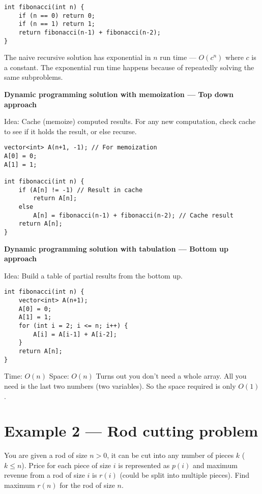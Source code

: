 \documentclass{article}
\begin{document}
\begin{lstlisting}[style=cppstyle]
int fibonacci(int n) {
    if (n == 0) return 0;
    if (n == 1) return 1;
    return fibonacci(n-1) + fibonacci(n-2);
}
\end{lstlisting}

The naive recursive solution has exponential in \(n\) run time — \(O(c^n)\) where \(c\) is a constant. The exponential run time happens because of repeatedly solving the same subproblems.

\textbf{Dynamic programming solution with memoization — Top down approach}

Idea: Cache (memoize) computed results. For any new computation, check cache to see if it holds the result, or else recurse.

\begin{lstlisting}[style=cppstyle]
vector<int> A(n+1, -1); // For memoization
A[0] = 0;
A[1] = 1;

int fibonacci(int n) {
    if (A[n] != -1) // Result in cache
        return A[n];
    else
        A[n] = fibonacci(n-1) + fibonacci(n-2); // Cache result
    return A[n];
}
\end{lstlisting}

\textbf{Dynamic programming solution with tabulation — Bottom up approach}

Idea: Build a table of partial results from the bottom up.

\begin{lstlisting}[style=cppstyle]
int fibonacci(int n) {
    vector<int> A(n+1);
    A[0] = 0;
    A[1] = 1;
    for (int i = 2; i <= n; i++) {
        A[i] = A[i-1] + A[i-2];
    }
    return A[n];
}
\end{lstlisting}

Time: \(O(n)\)  
Space: \(O(n)\)  
Turns out you don't need a whole array. All you need is the last two numbers (two variables). So the space required is only \(O(1)\).

\section{Example 2 — Rod cutting problem}

You are given a rod of size \(n > 0\), it can be cut into any number of pieces \(k\) (\(k \le n\)). Price for each piece of size \(i\) is represented as \(p(i)\) and maximum revenue from a rod of size \(i\) is \(r(i)\) (could be split into multiple pieces). Find maximum \(r(n)\) for the rod of size \(n\).
\end{document}
